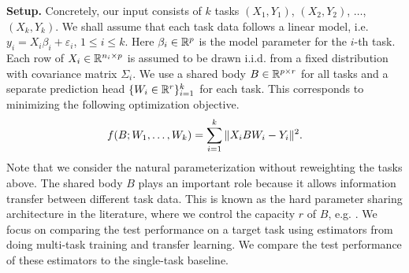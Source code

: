 



\textbf{Setup.} Concretely, our input consists of $k$ tasks $(X_1, Y_1)$, $(X_2, Y_2)$, $\dots$, $(X_k, Y_k)$.
We shall assume that each task data follows a linear model, i.e. $y_i = X_i \beta_i + \varepsilon_i$, $1\le i\le k$.
Here $\beta_i\in\mathbb{R}^p$ is the model parameter for the $i$-th task.
Each row of $X_i\in\mathbb{R}^{n_i\times p}$ is assumed to be drawn i.i.d. from a fixed distribution with covariance matrix $\Sigma_i$.
We use a shared body $B\in\mathbb{R}^{p\times r}$ for all tasks and a separate prediction head $\{W_i \in \mathbb{R}^{r}\}_{i=1}^k$ for each task.
This corresponds to minimizing the following optimization objective.
\begin{align}
	\label{eq_mtl}
	f(B; W_1, \dots, W_k) = \sum_{i=1}^k \|X_i B W_i - Y_i\|^2.
\end{align}
Note that we consider the natural parameterization without reweighting the tasks above.
The shared body $B$ plays an important role because it allows information transfer between different task data.
This is known as the hard parameter sharing architecture in the literature, where we control the capacity $r$ of $B$, e.g. \cite{KD12,WZR20}.
We focus on comparing the test performance on a target task using estimators from doing multi-task training and transfer learning.
We compare the test performance of these estimators to the single-task baseline.


